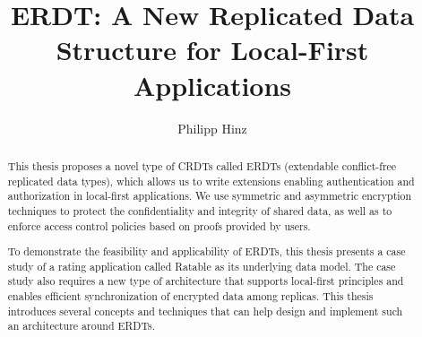 \documentclass[
	english,
	ruledheaders=section,   %
	class=report,		    %
	thesis={type=bachelor}, %
	accentcolor=9c,			%
	custommargins=true,    %
	marginpar=false,        %
	parskip=half-,          %
	fontsize=11pt,          %
]{tudapub}
\begin{document}

\title{ERDT: A New Replicated Data Structure for Local-First Applications}
\author[P. Hinz]{Philipp Hinz} %



\submissiondate{\today}
\examdate{\today}

\maketitle


\affidavit[signature-image={\texttt{[image: sign.jpg]}}]

\begin{abstract}
  This thesis proposes a novel type of CRDTs called ERDTs (extendable conflict-free replicated data types), which allows us to write extensions enabling authentication and authorization in local-first applications. We use symmetric and asymmetric encryption techniques to protect the confidentiality and integrity of shared data, as well as to enforce access control policies based on proofs provided by users.
  
  To demonstrate the feasibility and applicability of ERDTs, this thesis presents a case study of a rating application called Ratable as its underlying data model. The case study also requires a new type of architecture that supports local-first principles and enables efficient synchronization of encrypted data among replicas. This thesis introduces several concepts and techniques that can help design and implement such an architecture around ERDTs.
\end{abstract}
\end{document}
